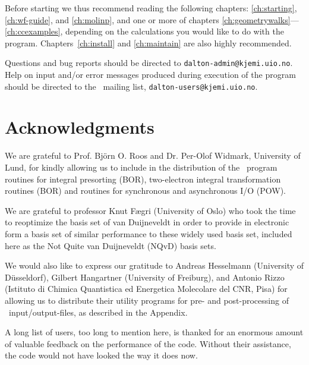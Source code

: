 Before starting we thus recommend reading
the following chapters: \ref{ch:starting}, \ref{ch:wf-guide}, and
\ref{ch:molinp}, and one or more of chapters
\ref{ch:geometrywalks}---\ref{ch:ccexamples}, depending on the
calculations you would like to do with the
program. Chapters~\ref{ch:install} and \ref{ch:maintain} are also
highly recommended.

Questions and bug reports should be
directed to \verb|dalton-admin@kjemi.uio.no|. Help on input and/or
error messages produced during execution of the program should be
directed to the \dalton\ mailing list,
\verb|dalton-users@kjemi.uio.no|.

\section{Acknowledgments}

We are grateful to Prof. Bj\"{o}rn O. Roos and Dr. Per-Olof
Widmark, University of Lund, for kindly allowing us to include in
the distribution of the \dalton\ program routines for integral
presorting (BOR), two-electron integral
transformation routines (BOR) and
routines for synchronous and asynchronous I/O (POW). 

We are grateful to professor Knut F\ae gri (University of Oslo) who
took the time to reoptimize the basis set of van Duijneveldt in order
to provide in electronic form a basis set of similar performance to
these widely used basis set, included here as the Not Quite van
Duijneveldt (NQvD) basis sets.

We would also like to express our gratitude to Andreas Hesselmann
(University of D\"{u}sseldorf), Gilbert Hangartner (University of
Freiburg), and Antonio
Rizzo (Istituto di Chimica Quantistica ed Energetica Molecolare del
CNR, Pisa) for allowing us to distribute their utility programs for
pre- and post-processing of \dalton\ input/output-files, as described
in the Appendix.

A long list of users, too long to mention here, is thanked for an
enormous amount of valuable feedback on the performance of the
code. Without their assistance, the code would not have looked the
way it does now.
